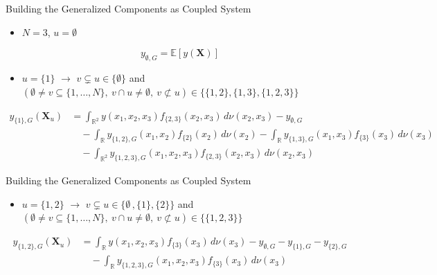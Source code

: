 \begin{frame}{Building the Generalized Components as Coupled System}
    \begin{itemize}
    \item $N = 3$, $u = \emptyset$
  \end{itemize}
    \begin{equation*}
    y_{\emptyset,G} = \mathbb{E}[y(\boldsymbol{X})]
    \end{equation*}
    \begin{itemize}
      \item \textcolor{pastelRedDark}{$u = \{1\}$ $\rightarrow$ $v \subsetneq u \in \{\emptyset\}$} and \textcolor{pastelBlueDark}{$(\emptyset \ne v \subseteq \{1,\dots,N\},\ v \cap u \ne \emptyset,\ v \not\subset u) \in \{\{1,2\}, \{1,3\}, \{1,2,3\}\}$}
    \end{itemize}
    \begin{align*}
       y_{{\{1\}},G}(\boldsymbol{X}_u) &= \int_{\mathbb{R}^{2}} y(x_1, x_2, x_3) f_{{\{2, 3\}}}(x_2, x_3) \, d \nu(x_2, x_3) - y_{\emptyset,G} \\[1em]
    &\quad - \int_{\mathbb{R}}y_{{\{1, 2\}}, G}(x_1, x_2)f_{{\{2\}}}(x_2) \, d \nu(x_2) - \int_{\mathbb{R}}y_{{\{1, 3\}}, G}(x_1, x_3)f_{{\{3\}}}(x_3) \, d \nu(x_3) \\[1em]
    &\quad - \int_{\mathbb{R}^2}y_{{\{1, 2, 3\}}, G}(x_1, x_2, x_3)f_{{\{2, 3\}}}(x_2, x_3) \, d \nu(x_2, x_3)
    \end{align*}
\end{frame}


\begin{frame}{Building the Generalized Components as Coupled System}
      \begin{itemize}
      \item \textcolor{pastelRedDark}{$u = \{1, 2\}$ $\rightarrow$ $v \subsetneq u \in \{\emptyset\,, \{1\}, \{2\}\}$} and \textcolor{pastelBlueDark}{$(\emptyset \ne v \subseteq \{1,\dots,N\},\ v \cap u \ne \emptyset,\ v \not\subset u) \in \{\{1,2,3\}\}$}
    \end{itemize}
    \begin{align*}
       y_{{\{1, 2\}},G}(\boldsymbol{X}_u) &= \int_{\mathbb{R}} y(x_1, x_2, x_3) f_{{\{3\}}}(x_3) \, d \nu(x_3) - y_{\emptyset,G} - y_{{\{1\}},G} - y_{{\{2\}},G}\\[1em]
    &\quad - \int_{\mathbb{R}}y_{{\{1, 2, 3\}}, G}(x_1, x_2, x_3)f_{{\{3\}}}(x_3) \, d \nu(x_3)
    \end{align*}
\end{frame}


